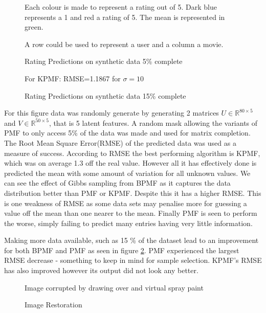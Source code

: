 \begin{figure}[!htbp]
  \begin{center}
    \resizebox{\textwidth}{!}{}
    Each colour is made to represent a rating out of 5. Dark blue represents a 1 and red a rating of 5. The mean is represented in green.
    
    A row could be used to represent a user and a column a movie.
    \caption{Rating Predictions on synthetic data 5\% complete}
     \label{fig:5pcmat}
  \end{center}
\end{figure}
\begin{figure}[!htbp]
  \begin{center} 
    \resizebox{\textwidth}{!}{}
    For KPMF: RMSE=1.1867 for $\sigma=10$
    \caption{Rating Predictions on synthetic data 15\% complete}
    \label{fig:15pcmat}
  \end{center}
\end{figure}
For this figure data was randomly generate by generating 2 matrices $U \in \mathbb{R}^{80\times 5}$ and $V \in \mathbb{R}^{50\times 5}$, that is 5 latent features. A  random mask allowing the variants of PMF to only access 5\% of the data was made and used for matrix completion. The Root Mean Square Error(RMSE) of the predicted data was used as a measure of success. According to RMSE the best performing algorithm is KPMF, which was on average 1.3 off the real value. However all it has effectively done is predicted the mean with some amount of variation for all unknown values. We can see the effect of Gibbs sampling from BPMF as it captures the data distribution better than PMF or KPMF. Despite this it has a higher RMSE. This is one weakness of RMSE as some data sets may penalise more for guessing a value off the mean than one nearer to the mean. Finally PMF is seen to perform the worse, simply failing to predict many entries having very little information.

Making more data available, such as 15 \% of the dataset lead to an improvement for both BPMF and PMF as seen in figure \ref{fig:15pcmat}. PMF experienced the largest RMSE decrease -  something to keep in mind for sample selection. KPMF's RMSE has also improved however its output did not look any better.
\begin{figure}[!htbp]
  \begin{center}
    \resizebox{\textwidth}{!}{}
    Image corrupted by drawing over and virtual spray paint
    \caption{Image Restoration}
    \label{fig:eiffel_tower}
  \end{center}
\end{figure}

